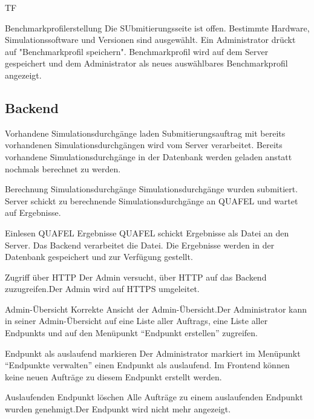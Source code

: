 \begin{Kriterien}{TF}
    \item[Benchmarkprofilerstellung] 
    \stand Die SUbmitierungsseite ist offen. Bestimmte Hardware, Simulationssoftware und Versionen sind ausgewählt. 
    \aktion Ein Administrator drückt auf "Benchmarkprofil speichern".
    \ergebnis Benchmarkprofil wird auf dem Server gespeichert und dem Administrator als neues auswählbares Benchmarkprofil angezeigt.

    \subsection{Backend}
    
    \item[Vorhandene Simulationsdurchgänge laden]
    \stand Submitierungsauftrag mit bereits vorhandenen Simulationsdurchgängen wird vom Server verarbeitet.
    \ergebnis Bereits vorhandene Simulationsdurchgänge in der Datenbank werden geladen anstatt nochmals berechnet zu werden.

    \item[Berechnung Simulationsdurchgänge] 
    \stand Simulationsdurchgänge wurden submitiert.
    \ergebnis Server schickt zu berechnende Simulationsdurchgänge an QUAFEL und wartet auf Ergebnisse.

    \item[Einlesen QUAFEL Ergebnisse]
    \stand QUAFEL schickt Ergebnisse als Datei an den Server.
    \ergebnis Das Backend verarbeitet die Datei. Die Ergebnisse werden in der Datenbank gespeichert und zur Verfügung gestellt.

    


    
    \item[Zugriff über \gls{HTTP}] Der Admin versucht, über HTTP auf das Backend zuzugreifen.\ergebnis Der Admin wird auf \gls{HTTPS} umgeleitet.

    \item[Admin-Übersicht] Korrekte Ansicht der Admin-Übersicht.\ergebnis Der Administrator kann in seiner Admin-Übersicht auf eine Liste aller \glspl{Auftrag}, eine Liste aller \glspl{Endpunkt} und auf den Menüpunkt \enquote{Endpunkt erstellen} zugreifen.

	\item[Endpunkt als auslaufend markieren] Der Administrator markiert im Menüpunkt \enquote{Endpunkte verwalten} einen Endpunkt als auslaufend. \ergebnis Im \gls{Frontend} können keine neuen Aufträge zu diesem Endpunkt erstellt werden.

    \item[Auslaufenden Endpunkt löschen] Alle Aufträge zu einem auslaufenden Endpunkt wurden genehmigt.\ergebnis Der Endpunkt wird nicht mehr angezeigt.


\end{Kriterien}
